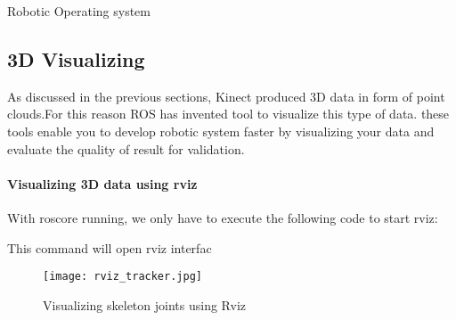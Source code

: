 \documentclass[a4paper]{book}
\begin{document}
\begin{chapter}{Robotic Operating system}


\subsection{3D Visualizing}
As discussed in the previous sections, Kinect produced 3D data in form of point clouds.For this reason ROS has invented tool to visualize this type of data.
these tools enable you to develop robotic system faster by visualizing your data and evaluate the quality of result for validation.
\paragraph{Visualizing 3D data using rviz}
With roscore running, we only have to execute the following code to start rviz:
\vspace{.5cm}
\newline
{}

\vspace{0.5cm}
This command will open rviz interfac
\begin{figure}[ht]
	\centering
	\caption{Visualizing skeleton joints using Rviz}
	\texttt{[image: rviz\_tracker.jpg]}
\end{figure}
	


\end{chapter}
\end{document}
